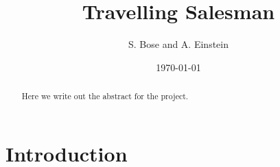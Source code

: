 \documentclass[12pt,a4paper]{article}
\begin{document}
%
% 
%

\title{ Travelling Salesman}
\author { S. Bose and A. Einstein}
\date{\today}
\maketitle

\begin{abstract}

Here we write out the abstract for the project. 
 
\end{abstract}
\section{Introduction}
\end{document}
